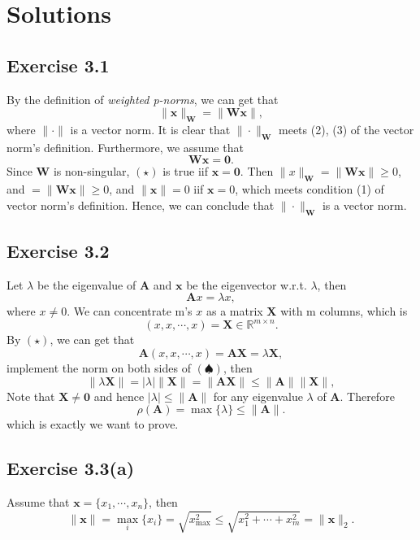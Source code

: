 \documentclass{article}
\begin{document}
\section{Solutions}
  \subsection{Exercise 3.1} 
    By the definition of \textit{weighted p-norms}, we can get that
    $$
         \| \bm{x} \|_{\bm{W}} = \|\bm{Wx} \|,
    $$
    where $\| \cdot \|$ is a vector norm. It is clear that $\|\cdot \|_{\bm{W}}$ meets (2), (3) of the vector norm's definition. Furthermore, we assume that
    \begin{equation*}
    \bm{Wx} = \bm{0}.  \tag{$\star$}
    \end{equation*}
    Since $\bm{W}$ is non-singular, $(\star)$ is true iif $\bm{x} = \bm{0}$. Then $\| x\|_{\bm{W}} = \|\bm{Wx} \| \geq 0$, and $ = \|\bm{Wx} \| \geq 0$, and $\| \bm{x} \|= 0 $ iif $\bm{x} = 0 $, which meets condition (1) of vector norm's definition. Hence, we can conclude that $\| \cdot \|_{\bm{W}}$ is a vector norm.

    \subsection{Exercise 3.2} 
        Let $\lambda$ be the eigenvalue of $\bm{A}$ and $\bm{x}$ be the eigenvector w.r.t. $\lambda$, then
        \begin{equation*}
        \bm{A} x = \lambda x, \tag{$\star$}
        \end{equation*}
        where $x \neq 0$. We can concentrate m's $x$ as a matrix $\bm{X}$ with m columns, which is 
        $$
        (x, x, \cdots, x) = \bm{X} \in \mathbb{R}^{m \times n}.
        $$
        By $(\star)$, we can get that
        \begin{equation*}
            \bm{A} (x, x, \cdots, x)= \bm{A} \bm{X}=\lambda \bm{X}, \tag{$\spadesuit$}
        \end{equation*}
        implement the norm on both sides of $(\spadesuit)$, then
        $$
        \| \lambda \bm{X} \| = | \lambda | \| \bm{X} \| = \| \bm{AX} \| \leq \| \bm{A} \| \|\bm{X} \|,
        $$
        Note that $\bm{X} \neq \bm{0}$ and hence $| \lambda | \leq \| \bm{A} \|$ for any eigenvalue $\lambda$ of $\bm{A}$. Therefore
        $$
        \rho(\bm{A}) = \max \{ \lambda \} \leq \| \bm{A} \|.
        $$
        which is exactly we want to prove.

    \subsection{Exercise 3.3(a)} 
        Assume that $\bm{x} = \{x_1, \cdots, x_n \}$, then
        $$
        \| \bm{x}\| = \max_i \{x_i\} = \sqrt{x^2_{\max}} \leq \sqrt{x_1^2 + \cdots + x_m^2 } = \| \bm{x} \|_2.
        $$
    
\end{document}
